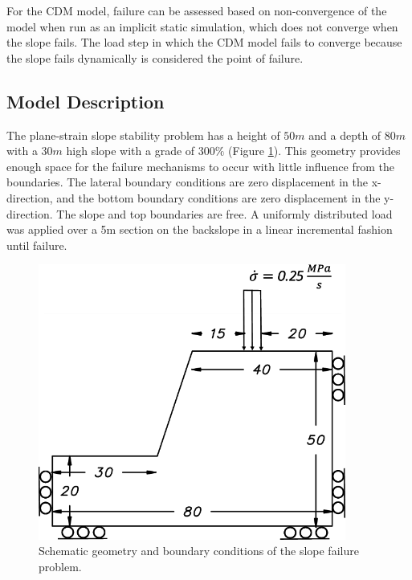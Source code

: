 For the CDM model, failure can be assessed based on non-convergence of the model when run as an implicit static simulation, which does not converge when the slope fails. The load step in which the CDM model fails to converge because the slope fails dynamically is considered the point of failure.

\subsection{Model Description}

The plane-strain slope stability problem has a height of $50m$ and a depth of $80m$ with a $30m$ high slope with a grade of $300\%$ (Figure \ref{fig:slopeGeom}). This geometry provides enough space for the failure mechanisms to occur with little influence from the boundaries. The lateral boundary conditions are zero displacement in the x-direction, and the bottom boundary conditions are zero displacement in the y-direction. The slope and top boundaries are free. A uniformly distributed load was applied over a 5m section on the backslope in a linear incremental fashion until failure.

\begin{figure}[!htb]
\begin{center}
\includegraphics[width=0.9\textwidth]{figures/Chapter5/SlopeSchematic}
\caption{{\label{fig:slopeGeom} Schematic geometry and boundary conditions of the slope failure problem.%
}}
\end{center}
\end{figure}


